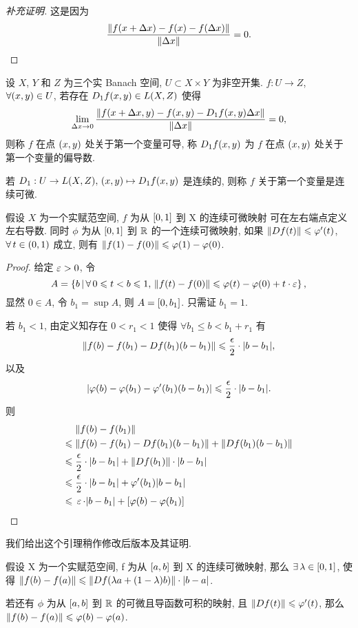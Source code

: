 \begin{proof}[补充证明]
这是因为
\[\frac{\fs{f\xk{x+\Delta x}-f\xk{x}-f\xk{\Delta x}}}{\fs{\Delta x}}=0.\]
\end{proof}
\begin{definition}
设 $X$, $Y$ 和 $Z$ 为三个实 Banach 空间, $U\subset X\times Y$ 为非空开集. $f:U\to Z$, $\forall\xk{x,y}\in U$, 若存在 $D_{1}f\xk{x,y}\in L\xk{X,Z}$ 使得
\[\lim _{\Delta x\to 0}\frac{\fs{f\xk{x+\Delta x,y}-f\xk{x,y}-D_{1}f\xk{x,y}\Delta x}}{\fs{\Delta x}}=0,\]
则称 $f$ 在点 $\left(x,y\right)$ 处关于第一个变量可导\rk, 称 $D_{1}f\xk{x,y}$ 为 $f$ 在点 $\left(x,y\right)$ 处关于第一个变量的偏导数.\par 
若 $D_{1}:U\to L\xk{X,Z},\,\xk{x,y}\mapsto D_{1}f\xk{x,y}$ 是连续的, 则称 $f$ 关于第一个变量是连续可微.
\end{definition}
\begin{lemma}
假设 $X$ 为一个实赋范空间, $f$ 为从 $\left[0,1\right]$ 到 X 的连续可微映射 \lk 可在左右端点定义左右导数\rk. 同时 $\phi$ 为从 $\left[0,1\right]$ 到 $\mathbb{R}$ 的一个连续可微映射, 如果 $\fs{D f\xk{t}}\leq\phi'\xk{t}$, $\forall t\in\xk{0,1}$ 成立, 则有 $\fs{f\xk{1}-f\xk{0}}\leq\phi\xk{1}-\phi\xk{0}$.
\end{lemma}
\begin{proof}
给定 $\operatorname{\varepsilon}>0$, 令
\[A=\jh{b}{\forall 0\leq t<b\leq 1,\,\fs{f\xk{t}-f\xk{0}}\leq\phi\xk{t}-\phi\xk{0}+t\cdot\eps},\]
显然 $0\in A$, 令 $b_1=\sup A$, 则 $A=\left[0,b_1\right]$. 只需证 $b_{1}=1$.\par
若 $b_{1}<1$, 由定义知存在 $0<r_{1}<1$ 使得 $\forall b_{1}\leq b<b_{1}+r_{1}$ 有
\[\fs{f\xk{b}-f\xk{b_{1}}-Df\xk{b_{1}}\xk{b-b_{1}}}\leq\frac{\epsilon}{2}\cdot\jd{b-b_{1}},\]
以及
\[\jd{\phi\xk{b}-\phi\xk{b_{1}}-\phi'\xk{b_{1}}\xk{b-b_{1}}}\leq\frac{\epsilon}{2}\cdot\jd{b-b_{1}}.\]
则
\begin{align*}
&\;\fs{f\xk{b}-f\xk{b_{1}}}\\
\leq&\;\fs{f\xk{b}-f\xk{b_{1}}-Df\xk{b_{1}}\xk{b-b_{1}}}+\fs{Df\xk{b_{1}}\xk{b-b_{1}}}\\
\leq&\;\frac{\epsilon}{2}\cdot\jd{b-b_{1}}+\fs{Df\xk{b_{1}}}\cdot\jd{b-b_{1}}\\
\leq&\;\frac{\epsilon}{2}\cdot\jd{b-b_{1}}+\phi'\xk{b_{1}}\jd{b-b_{1}}\\
\leq&\;\eps\cdot\jd{b-b_{1}}+\zk{\phi\xk{b}-\phi\xk{b_{1}}}\qedhere
\end{align*}
\end{proof}
我们给出这个引理稍作修改后版本及其证明.
\begin{lemma}[补充]
假设 X 为一个实赋范空间, f 为从 $\left[a,b\right]$ 到 X 的连续可微映射, 那么 $\exists\lambda\in\zk{0,1}$, 使得 $\fs{f\xk{b}-f\xk{a}}\leq\fs{Df\xk{\lambda a+\xk{1-\lambda}b}}\cdot\jd{b-a}$.\par 
若还有 $\phi$ 为从 $\left[a,b\right]$ 到 $\mathbb{R}$ 的可微且导函数可积的映射, 且 $\fs{D f\xk{t}}\leq\phi'\xk{t}$, 那么 $\fs{f\xk{b}-f\xk{a}}\leq\phi\xk{b}-\phi\xk{a}$.
\end{lemma}
